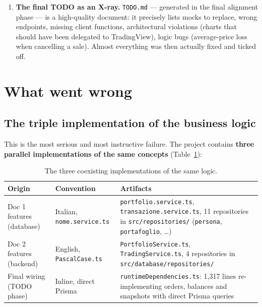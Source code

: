 \documentclass[11pt,a4paper]{article}
\newcommand{\file}[1]{\texttt{\small #1}}
\begin{document}
\begin{enumerate}[leftmargin=1.8em]
  \item \textbf{The final TODO as an X-ray.} \file{TODO.md} --- generated in the final alignment phase --- is a high-quality document: it precisely lists mocks to replace, wrong endpoints, missing client functions, architectural violations (charts that should have been delegated to TradingView), logic bugs (average-price loss when cancelling a sale). Almost everything was then actually fixed and ticked off.
\end{enumerate}

\section{What went wrong}

\subsection{The triple implementation of the business logic}
\label{sec:tripla}

This is the most serious and most instructive failure. The project contains \textbf{three parallel implementations of the same concepts} (Table~\ref{tab:tripla}):

\begin{table}[h!]
\centering
\small
\begin{tabular}{p{4.1cm}p{4.6cm}p{5.2cm}}
\toprule
\textbf{Origin} & \textbf{Convention} & \textbf{Artifacts} \\
\midrule
Doc 1 features (database) & Italian, \file{nome.service.ts} & \file{portfolio.service.ts}, \file{transazione.service.ts}, 11 repositories in \file{src/repositories/} (\file{persona}, \file{portafoglio}, \dots) \\
\addlinespace
Doc 2 features (backend) & English, \file{PascalCase.ts} & \file{PortfolioService.ts}, \file{TradingService.ts}, 4 repositories in \file{src/database/repositories/} \\
\addlinespace
Final wiring (TODO phase) & Inline, direct Prisma & \file{runtimeDependencies.ts}: 1{,}317 lines re-implementing orders, balances and snapshots with direct Prisma queries \\
\bottomrule
\end{tabular}
\caption{The three coexisting implementations of the same logic.}
\label{tab:tripla}
\end{table}
\end{document}
